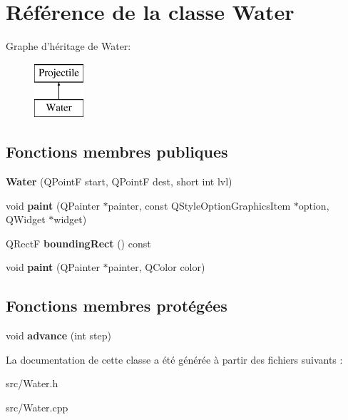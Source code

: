 \hypertarget{classWater}{
\section{Référence de la classe Water}
\label{classWater}
}
Graphe d'héritage de Water:\begin{figure}[H]
\begin{center}
\leavevmode
\includegraphics[height=2.000000cm]{classWater}
\end{center}
\end{figure}
\subsection*{Fonctions membres publiques}
\begin{DoxyCompactItemize}
\item 
\hypertarget{classWater_ada34e1066e8b672e509244a1bda18b48}{
{\bfseries Water} (QPointF start, QPointF dest, short int lvl)}
\label{classWater_ada34e1066e8b672e509244a1bda18b48}

\item 
\hypertarget{classWater_a1f8777c164bb06a357a78cabd9e790a2}{
void {\bfseries paint} (QPainter $\ast$painter, const QStyleOptionGraphicsItem $\ast$option, QWidget $\ast$widget)}
\label{classWater_a1f8777c164bb06a357a78cabd9e790a2}

\item 
\hypertarget{classProjectile_a0e0b18909c9c154404384707c6515802}{
QRectF {\bfseries boundingRect} () const }
\label{classProjectile_a0e0b18909c9c154404384707c6515802}

\item 
\hypertarget{classProjectile_aef0d6ffcea7620988cf5446d0c1133fa}{
void {\bfseries paint} (QPainter $\ast$painter, QColor color)}
\label{classProjectile_aef0d6ffcea7620988cf5446d0c1133fa}

\end{DoxyCompactItemize}
\subsection*{Fonctions membres protégées}
\begin{DoxyCompactItemize}
\item 
\hypertarget{classProjectile_a8e3b4bae49558a0febfce8c1accea72d}{
void {\bfseries advance} (int step)}
\label{classProjectile_a8e3b4bae49558a0febfce8c1accea72d}

\end{DoxyCompactItemize}


La documentation de cette classe a été générée à partir des fichiers suivants :\begin{DoxyCompactItemize}
\item 
src/Water.h\item 
src/Water.cpp\end{DoxyCompactItemize}
